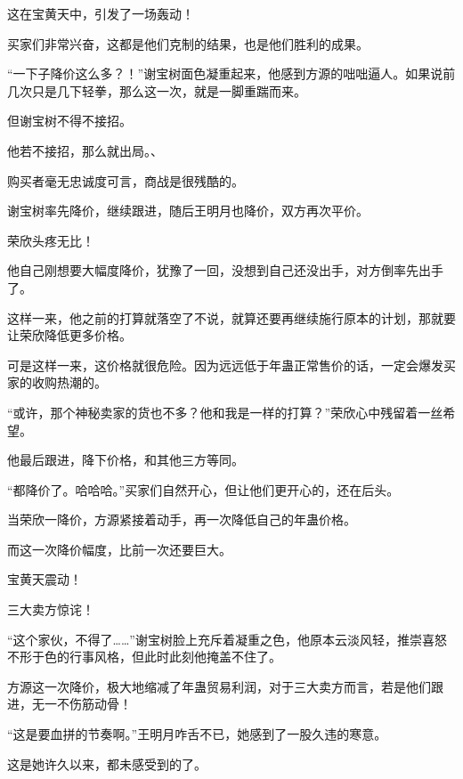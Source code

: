 \begin{this_body}
这在宝黄天中，引发了一场轰动！

买家们非常兴奋，这都是他们克制的结果，也是他们胜利的成果。

“一下子降价这么多？！”谢宝树面色凝重起来，他感到方源的咄咄逼人。如果说前几次只是几下轻拳，那么这一次，就是一脚重踹而来。

但谢宝树不得不接招。

他若不接招，那么就出局。、

购买者毫无忠诚度可言，商战是很残酷的。

谢宝树率先降价，继续跟进，随后王明月也降价，双方再次平价。

荣欣头疼无比！

他自己刚想要大幅度降价，犹豫了一回，没想到自己还没出手，对方倒率先出手了。

这样一来，他之前的打算就落空了不说，就算还要再继续施行原本的计划，那就要让荣欣降低更多价格。

可是这样一来，这价格就很危险。因为远远低于年蛊正常售价的话，一定会爆发买家的收购热潮的。

“或许，那个神秘卖家的货也不多？他和我是一样的打算？”荣欣心中残留着一丝希望。

他最后跟进，降下价格，和其他三方等同。

“都降价了。哈哈哈。”买家们自然开心，但让他们更开心的，还在后头。

当荣欣一降价，方源紧接着动手，再一次降低自己的年蛊价格。

而这一次降价幅度，比前一次还要巨大。

宝黄天震动！

三大卖方惊诧！

“这个家伙，不得了……”谢宝树脸上充斥着凝重之色，他原本云淡风轻，推崇喜怒不形于色的行事风格，但此时此刻他掩盖不住了。

方源这一次降价，极大地缩减了年蛊贸易利润，对于三大卖方而言，若是他们跟进，无一不伤筋动骨！

“这是要血拼的节奏啊。”王明月咋舌不已，她感到了一股久违的寒意。

这是她许久以来，都未感受到的了。

\end{this_body}

